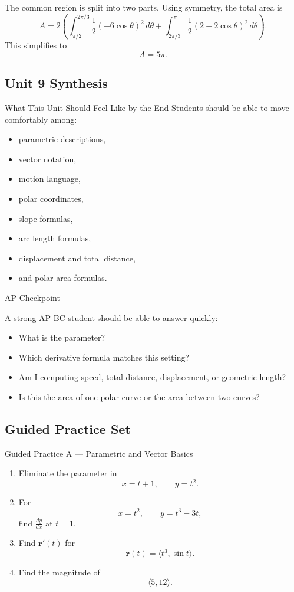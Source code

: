 \documentclass[11pt]{article}
\newcommand{\solution}{\noindent{\textbf{Solution.}}}
\newcommand{\apcheckpoint}[1]{%
\begin{skillbox}{AP Checkpoint}
#1
\end{skillbox}
}
\newcommand{\vect}[1]{\mathbf{#1}}
\begin{document}
\solution
The common region is split into two parts.
Using symmetry, the total area is
\[
A
=
2\left(
\int_{\pi/2}^{2\pi/3}\frac12(-6\cos\theta)^2\,d\theta
+
\int_{2\pi/3}^{\pi}\frac12(2-2\cos\theta)^2\,d\theta
\right).
\]
This simplifies to
\[
A=5\pi.
\]

\newpage
\subsection{Unit 9 Synthesis}

\begin{theorybox}{What This Unit Should Feel Like by the End}
Students should be able to move comfortably among:
\begin{itemize}
    \item parametric descriptions,
    \item vector notation,
    \item motion language,
    \item polar coordinates,
    \item slope formulas,
    \item arc length formulas,
    \item displacement and total distance,
    \item and polar area formulas.
\end{itemize}
\end{theorybox}

\apcheckpoint{
A strong AP BC student should be able to answer quickly:
\begin{itemize}
    \item What is the parameter?
    \item Which derivative formula matches this setting?
    \item Am I computing speed, total distance, displacement, or geometric length?
    \item Is this the area of one polar curve or the area between two curves?
\end{itemize}
}

\newpage
\subsection{Guided Practice Set}

\begin{practicebox}{Guided Practice A --- Parametric and Vector Basics}
\begin{enumerate}
    \item Eliminate the parameter in
    \[
    x=t+1,\qquad y=t^2.
    \]
    \item For
    \[
    x=t^2,\qquad y=t^3-3t,
    \]
    find \(\frac{dy}{dx}\) at \(t=1\).
    \item Find \(\vect{r}'(t)\) for
    \[
    \vect{r}(t)=\langle t^3,\sin t\rangle.
    \]
    \item Find the magnitude of
    \[
    \langle 5,12\rangle.
    \]
\end{enumerate}
\end{practicebox}
\end{document}
